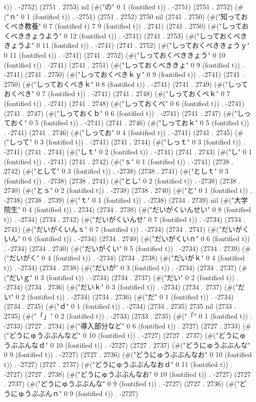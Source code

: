 t)) . -2752) (2751 . 2753) nil (#("の" 0 1 (fontified t)) . -2751) (2751 . 2752) (#("ｎ" 0 1 (fontified t)) . -2751) (2751 . 2752) 2750 nil (2741 . 2750) (#("知っておくべき教養" 0 7 (fontified t) 7 9 (fontified t)) . 2741) (2741 . 2750) (#("しっておくべききょうよう" 0 12 (fontified t)) . -2741) (2741 . 2753) (#("しっておくべききょうよ" 0 11 (fontified t)) . -2741) (2741 . 2752) (#("しっておくべききょうｙ" 0 11 (fontified t)) . -2741) (2741 . 2752) (#("しっておくべききょう" 0 10 (fontified t)) . -2741) (2741 . 2751) (#("しっておくべききょ" 0 9 (fontified t)) . -2741) (2741 . 2750) (#("しっておくべきｋｙ" 0 9 (fontified t)) . -2741) (2741 . 2750) (#("しっておくべきｋ" 0 8 (fontified t)) . -2741) (2741 . 2749) (#("しっておくべき" 0 7 (fontified t)) . -2741) (2741 . 2748) (#("しっておくべｋ" 0 7 (fontified t)) . -2741) (2741 . 2748) (#("しっておくべ" 0 6 (fontified t)) . -2741) (2741 . 2747) (#("しっておくｂ" 0 6 (fontified t)) . -2741) (2741 . 2747) (#("しっておく" 0 5 (fontified t)) . -2741) (2741 . 2746) (#("しっておｋ" 0 5 (fontified t)) . -2741) (2741 . 2746) (#("しってお" 0 4 (fontified t)) . -2741) (2741 . 2745) (#("しって" 0 3 (fontified t)) . -2741) (2741 . 2744) (#("しっｔ" 0 3 (fontified t)) . -2741) (2741 . 2744) (#("しｔ" 0 2 (fontified t)) . -2741) (2741 . 2743) (#("し" 0 1 (fontified t)) . -2741) (2741 . 2742) (#("ｓ" 0 1 (fontified t)) . -2741) (2738 . 2742) (#("として" 0 3 (fontified t)) . -2738) (2738 . 2741) (#("としｔ" 0 3 (fontified t)) . -2738) (2738 . 2741) (#("とし" 0 2 (fontified t)) . -2738) (2738 . 2740) (#("とｓ" 0 2 (fontified t)) . -2738) (2738 . 2740) (#("と" 0 1 (fontified t)) . -2738) (2738 . 2739) (#("ｔ" 0 1 (fontified t)) . -2738) (2734 . 2739) nil (#("大学院生" 0 4 (fontified t)) . 2734) (2734 . 2738) (#("だいがくいんせい" 0 8 (fontified t)) . -2734) (2734 . 2742) (#("だいがくいんせ" 0 7 (fontified t)) . -2734) (2734 . 2741) (#("だいがくいんｓ" 0 7 (fontified t)) . -2734) (2734 . 2741) (#("だいがくいん" 0 6 (fontified t)) . -2734) (2734 . 2740) (#("だいがくいｎ" 0 6 (fontified t)) . -2734) (2734 . 2740) (#("だいがくい" 0 5 (fontified t)) . -2734) (2734 . 2739) (#("だいがく" 0 4 (fontified t)) . -2734) (2734 . 2738) (#("だいがｋ" 0 4 (fontified t)) . -2734) (2734 . 2738) (#("だいが" 0 3 (fontified t)) . -2734) (2734 . 2737) (#("だいｇ" 0 3 (fontified t)) . -2734) (2734 . 2737) (#("だい" 0 2 (fontified t)) . -2734) (2734 . 2736) (#("だいｋ" 0 3 (fontified t)) . -2734) (2734 . 2737) (#("だい" 0 2 (fontified t)) . -2734) (2734 . 2736) (#("だ" 0 1 (fontified t)) . -2734) (2734 . 2735) (#("ｄ" 0 1 (fontified t)) . -2734) (2734 . 2735) 2735 nil (2733 . 2735) (#("「」" 0 2 (fontified t)) . -2733) (2733 . 2735) (#("「" 0 1 (fontified t)) . -2733) (2727 . 2734) (#("導入部分など" 0 6 (fontified t)) . 2727) (2727 . 2733) (#("どうにゅうぶぶんなど" 0 10 (fontified t)) . -2727) (2727 . 2737) (#("どうにゅうぶぶんなｄ" 0 10 (fontified t)) . -2727) (2727 . 2737) (#("どうにゅうぶぶんな" 0 9 (fontified t)) . -2727) (2727 . 2736) (#("どうにゅうぶぶんなお" 0 10 (fontified t)) . -2727) (2727 . 2737) (#("どうにゅうぶぶんなおｄ" 0 11 (fontified t)) . -2727) (2727 . 2738) (#("どうにゅうぶぶんなお" 0 10 (fontified t)) . -2727) (2727 . 2737) (#("どうにゅうぶぶんな" 0 9 (fontified t)) . -2727) (2727 . 2736) (#("どうにゅうぶぶんｎ" 0 9 (fontified t)) . -2727) 